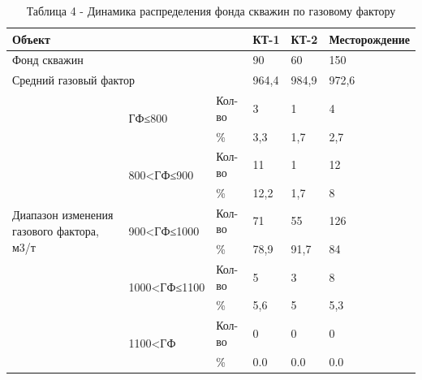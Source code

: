 \begin{table}[H]
\caption*{Таблица 4 - Динамика распределения фонда скважин по газовому фактору}
\centering
\begin{tabular}{|lll|l|l|l|}
\hline
\multicolumn{3}{|l|}{Объект} & КТ-1 & КТ-2 & Месторождение \\ \hline
\multicolumn{3}{|l|}{Фонд скважин} & 90 & 60 & 150 \\ \hline
\multicolumn{3}{|l|}{Средний газовый фактор} & 964,4 & 984,9 & 972,6 \\ \hline
\multicolumn{1}{|p{0.2\textwidth}|}{\multirow{10}{=}{Диапазон изменения газового фактора, м3/т}} & \multicolumn{1}{l|}{\multirow{2}{*}{ГФ≤800}} & Кол-во & 3 & 1 & 4 \\ \cline{3-6} 
\multicolumn{1}{|l|}{} & \multicolumn{1}{l|}{} & \% & 3,3 & 1,7 & 2,7 \\ \cline{2-6} 
\multicolumn{1}{|l|}{} & \multicolumn{1}{l|}{\multirow{2}{*}{800<ГФ≤900}} & Кол-во & 11 & 1 & 12 \\ \cline{3-6} 
\multicolumn{1}{|l|}{} & \multicolumn{1}{l|}{} & \% & 12,2 & 1,7 & 8 \\ \cline{2-6} 
\multicolumn{1}{|l|}{} & \multicolumn{1}{l|}{\multirow{2}{*}{900<ГФ≤1000}} & Кол-во & 71 & 55 & 126 \\ \cline{3-6} 
\multicolumn{1}{|l|}{} & \multicolumn{1}{l|}{} & \% & 78,9 & 91,7 & 84 \\ \cline{2-6} 
\multicolumn{1}{|l|}{} & \multicolumn{1}{l|}{\multirow{2}{*}{1000<ГФ≤1100}} & Кол-во & 5 & 3 & 8 \\ \cline{3-6} 
\multicolumn{1}{|l|}{} & \multicolumn{1}{l|}{} & \% & 5,6 & 5 & 5,3 \\ \cline{2-6} 
\multicolumn{1}{|l|}{} & \multicolumn{1}{l|}{\multirow{2}{*}{1100<ГФ}} & Кол-во & 0 & 0 & 0 \\ \cline{3-6} 
\multicolumn{1}{|l|}{} & \multicolumn{1}{l|}{} & \% & 0.0 & 0.0 & 0.0 \\ \hline
\end{tabular}
\end{table}


